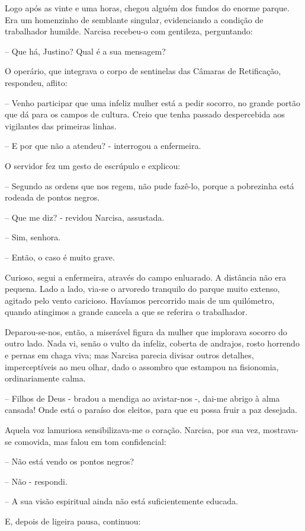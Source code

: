 \documentclass[portuguese,12pt,a4paper]{scrbook}
\begin{document}
	Logo após as vinte e uma horas, chegou alguém dos fundos do enorme parque. Era um homenzinho de semblante singular, evidenciando a condição de trabalhador humilde. Narcisa recebeu-o com gentileza, perguntando:
	
	– Que há, Justino? Qual é a sua mensagem?
	
	O operário, que integrava o corpo de sentinelas das Câmaras de Retificação, respondeu, aflito:
	
	– Venho participar que uma infeliz mulher está a pedir socorro, no grande portão que dá para os campos de cultura. Creio que tenha passado despercebida aos vigilantes das primeiras linhas.
	
	– E por que não a atendeu? - interrogou a enfermeira.
	
	O servidor fez um gesto de escrúpulo e explicou:
	
	
	– Segundo as ordens que nos regem, não pude fazê-lo, porque a pobrezinha está rodeada de pontos negros.
	
	– Que me diz? - revidou Narcisa, assustada.
	
	– Sim, senhora.
	
	– Então, o caso é muito grave.
	
	Curioso, segui a enfermeira, através do campo enluarado. A distância não era pequena. Lado a lado, via-se o arvoredo tranquilo do parque muito extenso, agitado pelo vento caricioso. Havíamos percorrido mais de um quilómetro, quando atingimos a grande cancela a que se referira o trabalhador.
	
	Deparou-se-nos, então, a miserável figura da mulher que implorava socorro do outro lado. Nada vi, senão o vulto da infeliz, coberta de andrajos, rosto horrendo e pernas em chaga viva; mas Narcisa parecia divisar outros detalhes, imperceptíveis ao meu olhar, dado o assombro que estampou na fisionomia, ordinariamente calma.
	
	– Filhos de Deus - bradou a mendiga ao avistar-nos -, dai-me abrigo à alma cansada! Onde está o paraíso dos eleitos, para que eu possa fruir a paz desejada.
	
	Aquela voz lamuriosa sensibilizava-me o coração. Narcisa, por sua vez, mostrava-se comovida, mas falou em tom confidencial:
	
	– Não está vendo os pontos negros?
	
	– Não - respondi.
	
	– A sua visão espiritual ainda não está suficientemente educada.
	
	E, depois de ligeira pausa, continuou:
	
\end{document}

